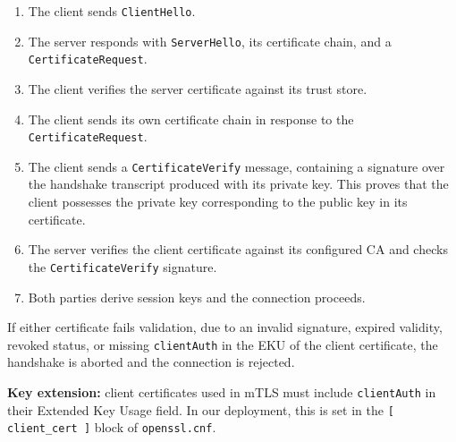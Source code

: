 \documentclass[10pt,twocolumn]{article}
\begin{document}
\begin{enumerate}
  \item The client sends \texttt{ClientHello}.
  \item The server responds with \texttt{ServerHello}, its certificate chain,
        and a \texttt{CertificateRequest}.
  \item The client verifies the server certificate against its trust store.
  \item The client sends its own certificate chain in response to the
        \texttt{CertificateRequest}.
  \item The client sends a \texttt{CertificateVerify} message, containing a
        signature over the handshake transcript produced with its private key.
        This proves that the client possesses the private key corresponding
        to the public key in its certificate.
  \item The server verifies the client certificate against its configured CA
        and checks the \texttt{CertificateVerify} signature.
  \item Both parties derive session keys and the connection proceeds.
\end{enumerate}

If either certificate fails validation, due to an invalid signature,
expired validity, revoked status, or missing \texttt{clientAuth} in the EKU
of the client certificate, the handshake is aborted and the connection is
rejected.

\begin{infobox}
\footnotesize
\textbf{Key extension:} client certificates used in mTLS must include
\texttt{clientAuth} in their Extended Key Usage field. In our deployment,
this is set in the \texttt{[ client\_cert ]} block of
\texttt{openssl.cnf}.
\end{infobox}
\end{document}
